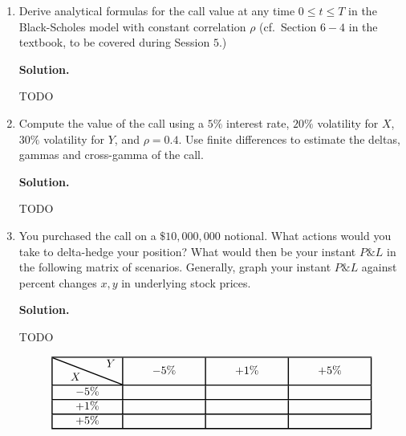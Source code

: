 \documentclass[12pt]{article}
\newenvironment{solution}{\vspace{0.2cm} \textbf{Solution.}}{}
\begin{document}
	\begin{enumerate}[label=(\alph*)]
		
		\item Derive analytical formulas for the call value at any time $0 \leq t \leq T$ in the Black-Scholes model with constant correlation $\rho$ (cf.\ Section $6-4$ in the textbook, to be covered during Session $5$.)
		
		\begin{solution}
			
			TODO
			
		\end{solution}
		
		\item Compute the value of the call using a $5\%$ interest rate, $20\%$ volatility for $X$, $30\%$ volatility for $Y$, and $\rho = 0.4$. Use finite differences to estimate the deltas, gammas and cross-gamma of the call.
		
		\begin{solution}
			
			TODO
			
		\end{solution}
		
		\item You purchased the call on a $\$10,000,000$ notional. What actions would you take to delta-hedge your position? What would then be your instant $P\&L$ in the following matrix of scenarios. Generally, graph your instant $P\&L$ against percent changes $x, y$ in underlying stock prices.
		
		\begin{solution}
			
			TODO
			
		\[
		\linethickness{1pt}
		\setlength{\arrayrulewidth}{1pt}
		\begin{tabular}{|c|c|c|c|}
			\hline
			\backslashbox{$\quad X$}{$\quad Y$} & $\qquad -5\% \qquad$ & \qquad $+1\%\qquad$ & \qquad $+5\%\qquad$ \\ \hline
			$-5\%$ &  &  & \\ \hline
			$+1\%$ &  &  & \\ \hline
			$+5\%$ &  &  & \\ \hline
		\end{tabular}
		\]
			
		\end{solution}
	
	\end{enumerate}
\end{document}
